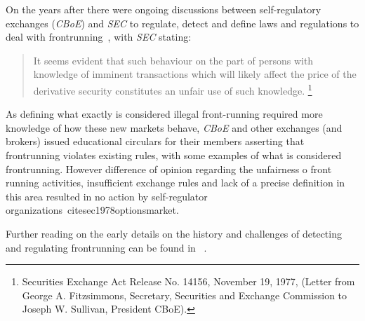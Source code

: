 

On the years after there were ongoing discussions between self-regulatory exchanges (\eg \textit{CBoE}) and  \textit{SEC} to regulate, detect and define laws and regulations to deal with frontrunning~\cite{markham1988front}, with \textit{SEC} stating: 
\begin{quote}
It seems evident that such behaviour on the part of persons with knowledge of imminent transactions which will likely affect the price of the derivative security constitutes an unfair use of such knowledge. \footnote{Securities Exchange Act Release No. 14156, November 19, 1977, (Letter from George A. Fitzsimmons, Secretary, Securities and Exchange Commission to Joseph W. Sullivan, President  CBoE).}
\end{quote} 

As defining what exactly is considered illegal front-running required more knowledge of how these new markets behave, \textit{CBoE} and other exchanges (and brokers) issued educational circulars for their members asserting that frontrunning violates existing rules, with some examples of what is considered frontrunning. However difference of opinion regarding the unfairness o front running activities, insufficient exchange rules and lack of a precise definition in this area resulted in no action by self-regulator organizations~cite{sec1978optionsmarket}. 

Further reading on the early details on the history and challenges of detecting and regulating frontrunning can be found in~\cite{markham1988front} . %

